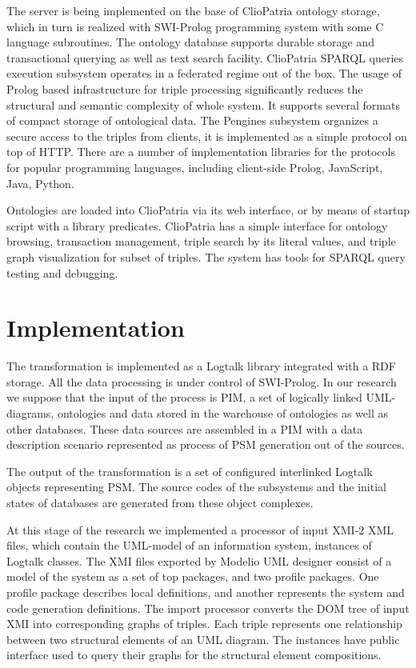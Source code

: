 \documentclass[runningheads]{llncs}
\begin{document}
The server is being implemented on the base of ClioPatria ontology storage, which in turn is realized with SWI-Prolog programming system with some C language subroutines.  The ontology database supports durable storage and transactional querying as well as text search facility.  ClioPatria SPARQL queries execution subsystem operates in a federated regime out of the box.  The usage of Prolog based infrastructure for triple processing significantly reduces the structural and semantic complexity of whole system. It supports several formats of compact storage of ontological data.  The Pengines subsystem organizes a secure access to the triples from clients, it is implemented as a simple protocol on top of HTTP.  There are a number of implementation libraries for the protocols for popular programming languages, including client-side Prolog, JavaScript, Java, Python.

Ontologies are loaded into ClioPatria via its web interface, or by means of startup script with a library predicates.  ClioPatria has a simple interface for ontology browsing, transaction management, triple search by its literal values, and triple graph visualization for subset of triples.  The system has tools for SPARQL query testing and debugging.

\section{Implementation}
\label{sec:impl}

The transformation is implemented as a Logtalk library integrated with a RDF storage.  All the data processing is under control of SWI-Prolog.  In our research we suppose that the input of the process is PIM, a set of logically linked UML-diagrams, ontologies and data stored in the warehouse of ontologies as well as other databases.  These data sources are assembled in a PIM with a data description scenario represented as process of PSM generation out of the sources.

The output of the transformation is a set of configured interlinked Logtalk objects representing PSM.  The source codes of the subsystems and the initial states of databases are generated from these object complexes.

At this stage of the research we implemented a processor of input XMI-2 XML files, which contain the UML-model of an information system, instances of Logtalk classes.  The XMI files exported by Modelio UML designer consist of a model of the system as a set of top packages, and two profile packages.  One profile package describes local definitions, and another represents the system and code generation definitions.  The import processor converts the DOM tree of input XMI into corresponding graphs of triples.  Each triple represents one relationship between two structural elements of an UML diagram.  The instances have public interface used to query their graphs for the structural element compositions.
\end{document}
